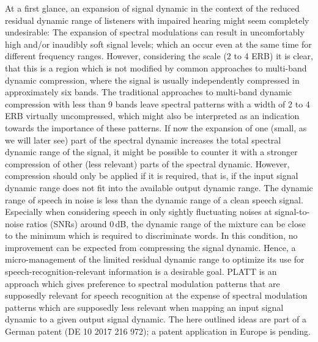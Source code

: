 \documentclass[10pt,a4paper,twocolumn]{article}
\begin{document}
At a first glance, an expansion of signal dynamic in the context of the reduced residual dynamic range of listeners with impaired hearing might seem completely undesirable:
%
The expansion of spectral modulations can result in uncomfortably high and/or inaudibly soft signal levels; which an occur even at the same time for different frequency ranges.
%
However, considering the scale (2 to 4 ERB) it is clear, that this is a region which is not modified by common approaches to multi-band dynamic compression, where the signal is usually independently compressed in approximately six bands.
%
The traditional approaches to multi-band dynamic compression with less than 9 bands leave spectral patterns with a width of 2 to 4 ERB virtually uncompressed, which might also be interpreted as an indication towards the importance of these patterns. 
%
If now the expansion of one (small, as we will later see) part of the spectral dynamic increases the total spectral dynamic range of the signal, it might be possible to counter it with a stronger compression of other (less relevant) parts of the spectral dynamic.
%
However, compression should only be applied if it is required, that is, if the input signal dynamic range does not fit into the available output dynamic range.
%
The dynamic range of speech in noise is less than the dynamic range of a clean speech signal.
%
Especially when considering speech in only sightly fluctuating noises at signal-to-noise ratios (SNRs) around 0\,dB, the dynamic range of the mixture can be close to the minimum which is required to discriminate words.
%
In this condition, no improvement can be expected from compressing the signal dynamic.
%
Hence, a micro-management of the limited residual dynamic range to optimize its use for speech-recognition-relevant information is a desirable goal.
%
PLATT is an approach which gives preference to spectral modulation patterns that are supposedly relevant for speech recognition at the expense of spectral modulation patterns which are supposedly less relevant when mapping an input signal dynamic to a given output signal dynamic.
%
The here outlined ideas are part of a German patent (DE 10 2017 216 972); a patent application in Europe is pending.
\end{document}
